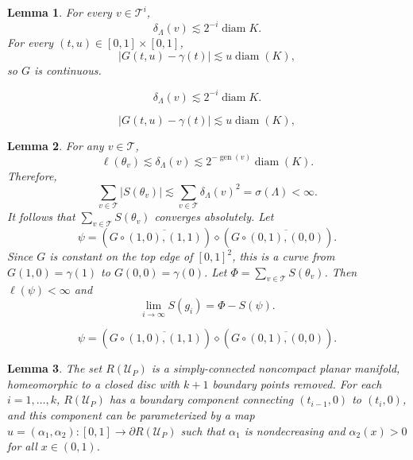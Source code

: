 \documentclass[10pt,a4paper]{amsart}
\newtheorem{lemma}{Lemma}
\newcommand{\cT}{\mathcal{T}}
\newcommand{\cU}{\mathcal{U}}
\DeclareMathOperator{\diam}{diam}
\newcommand{\from}{\colon}
\DeclareMathOperator{\gen}{gen}
\begin{document}
\begin{lemma}\label{lem:nbhd-diam}
  For every $v\in \cT^i$,
  \begin{equation}\label{eq:delta-lambda-bound}
    \delta_\Lambda(v) \lesssim 2^{-i}\diam K.
  \end{equation}
  For every $(t,u) \in [0,1]\times [0,1]$,
  \begin{equation}\label{eq:G-gamma-dist}
    |G(t,u) - \gamma(t)| \lesssim u \diam(K),
  \end{equation}
  so $G$ is continuous.
\end{lemma}

  \begin{equation}
    \delta_\Lambda(v) \lesssim 2^{-i}\diam K.
  \end{equation}

  \begin{equation}
    |G(t,u) - \gamma(t)| \lesssim u \diam(K),
  \end{equation}

\begin{lemma}\label{lem:sgi-converge}
  For any $v\in \cT$, 
  \begin{equation}\label{eq:ell-theta-v}
    \ell(\theta_v) \lesssim \delta_\Lambda(v) \lesssim 2^{-\gen(v)}\diam(K).
  \end{equation}
  Therefore,
  $$\sum_{v\in \cT} |S(\theta_v)| \lesssim \sum_{v\in \cT} \delta_\Lambda(v)^2 = \sigma(\Lambda)<\infty.$$
  It follows that $\sum_{v\in \cT} S(\theta_v)$ converges absolutely. Let
  \begin{equation}\label{eq:def-psi}
    \psi = (G\circ \overline{(1,0),(1,1)}) \diamond (G\circ \overline{(0,1),(0,0)}).
  \end{equation}
  Since $G$ is constant on the top edge of $[0,1]^2$, this is a curve from $G(1,0) = \gamma(1)$ to $G(0,0) = \gamma(0)$.
  Let $\Phi = \sum_{v\in \cT} S(\theta_v)$. 
  Then $\ell(\psi)<\infty$ and
  $$\lim_{i\to \infty} S(g_i) = \Phi - S(\psi).$$
\end{lemma}

  \begin{equation}
    \psi = (G\circ \overline{(1,0),(1,1)}) \diamond (G\circ \overline{(0,1),(0,0)}).
  \end{equation}

\begin{lemma}\label{lem:boundary-arches}
  The set $R(\cU_P)$ is a simply-connected noncompact planar manifold, homeomorphic to a closed disc with $k+1$ boundary points removed. For each $i=1,\dots,k$, $R(\cU_P)$ has a boundary component connecting $(t_{i-1},0)$ to $(t_{i},0)$, and this component can be parameterized by a map $u=(\alpha_1,\alpha_2)\from [0,1]\to \partial R(\cU_P)$ such that $\alpha_1$ is nondecreasing and $\alpha_2(x)>0$ for all $x\in (0,1)$.
\end{lemma}
\end{document}
